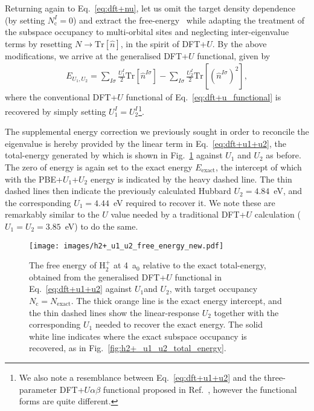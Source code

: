 Returning again to Eq.~\eqref{eq:dft+nu}, 
let us omit the target density dependence 
(by setting $N^I_\textrm{c}=0$) 
and extract the free-energy~\cite{PhysRevA.72.024502} 
while adapting the treatment of 
the subspace occupancy to 
multi-orbital sites and 
neglecting inter-eigenvalue terms 
by resetting 
$N\to \textrm{Tr}[\hat{n}]$, 
in the spirit of DFT+$U$.
%
By the above modifications, 
we arrive at the generalised DFT+$U$ functional,
given by
%
\begin{align}
E_{U_1,U_2} = \sum_{I \sigma} \frac{U^I_1}{2} 
\mathrm{Tr} \left[ \hat{n}^{I \sigma} \right]  
-  \sum_{I \sigma}  \frac{U^I_2}{2}
  \mathrm{Tr} 
\left[ (\hat{n}^{I \sigma})^{ 2} \right], 
\label{eq:dft+u1+u2}
\end{align}
%
where the conventional DFT+$U$ functional of 
Eq.~\eqref{eq:dft+u_functional} is recovered 
by simply setting $U^I_1=U^I_2$\footnote{
We also note a resemblance between Eq.~\eqref{eq:dft+u1+u2} 
and the three-parameter DFT+$U\alpha\beta$ functional
proposed in Ref.~\cite{dabo2008towards}, 
however the functional forms are quite different.}.

The supplemental energy correction 
we previously sought in 
order to reconcile the eigenvalue 
is hereby provided by the 
linear term in Eq.~\eqref{eq:dft+u1+u2}, 
the total-energy generated by which is shown in 
Fig.~\ref{fig:h2+_u1_u2_free_energy} 
against $U_1$ and $U_2$ as before.
The zero of energy is again 
set to the exact energy $E_\textrm{exact}$, 
the intercept of which with 
the PBE+$U_1$+$U_2$ energy is 
indicated by the heavy dashed line.
%
The thin dashed lines then indicate 
the previously calculated Hubbard 
$U_2 = 4.84$~eV, 
and the corresponding
$U_1 = 4.44$~eV 
required to recover it.
%
We note these are remarkably similar to 
the $U$ value needed by a 
traditional DFT+$U$ calculation 
($U_1=U_2 = 3.85$~eV) 
to do the same.

\begin{figure}[th!]
\centering
\texttt{[image: images/h2+\_u1\_u2\_free\_energy\_new.pdf]}
\caption[DFT+$U_1$+$U_2$ free energy landscape of H$_2^+$]{
The free energy of H$_2^+$ at 4~a$_0$ 
relative to the exact total-energy, 
obtained from the generalised DFT+$U$ 
functional in Eq.~\eqref{eq:dft+u1+u2}
against $U_1$and $U_2$,  
with target occupancy $N_\textrm{c} = N_\textrm{exact}$.
%
The thick orange line is the 
exact energy intercept, 
and the thin dashed lines show 
the linear-response $U_2$ 
together with the corresponding $U_1$ 
needed to recover the exact energy.
%
The solid white line 
indicates where the exact subspace
occupancy is recovered,
as in Fig.~\ref{fig:h2+_u1_u2_total_energy}.
}
\label{fig:h2+_u1_u2_free_energy}
\end{figure}


